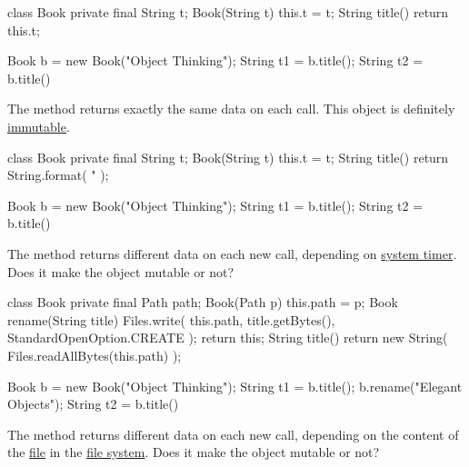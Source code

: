 \documentclass{article}
\begin{document}
\begin{pptWide}{2}
{\small\begin{ffcode}
class Book {
  private final String t;
  Book(String t) { this.t = t; }
  String title() {
    return this.t;
  }
}
\end{ffcode}
}
\par\columnbreak\par
{\small\begin{ffcode}
Book b = new Book("Object Thinking");
String t1 = b.title();
String t2 = b.title()
\end{ffcode}
}
\par
The  method returns exactly the same data on each call.
This object is definitely \ul{immutable}.
\end{pptWide}
\par
\plush{}

\begin{pptWide}{2}
{\small\begin{ffcode}
class Book {
  private final String t;
  Book(String t) { this.t = t; }
  String title() {
    return String.format(
      "%
    );
  }
}
\end{ffcode}
}
\par\columnbreak\par
{\small\begin{ffcode}
Book b = new Book("Object Thinking");
String t1 = b.title();
String t2 = b.title()
\end{ffcode}
}
\par
The  method returns different data on each new call,
depending on \ul{system timer}.
Does it make the object mutable or not?
\end{pptWide}
\par
\plush{}

\begin{pptWide}{2}
{\scriptsize\begin{ffcode}
class Book {
  private final Path path;
  Book(Path p) { this.path = p; }
  Book rename(String title) {
    Files.write(
      this.path,
      title.getBytes(),
      StandardOpenOption.CREATE
    );
    return this;
  }
  String title() {
    return new String(
      Files.readAllBytes(this.path)
    );
  }
}
\end{ffcode}
}
\par\columnbreak\par
{\small\begin{ffcode}
Book b = new Book("Object Thinking");
String t1 = b.title();
b.rename("Elegant Objects");
String t2 = b.title()
\end{ffcode}
}
\par
The  method returns different data on each new call,
depending on the content of the \ul{file} in the \ul{file system}.
Does it make the object mutable or not?
\end{pptWide}
\par
\plush{}
\end{document}

